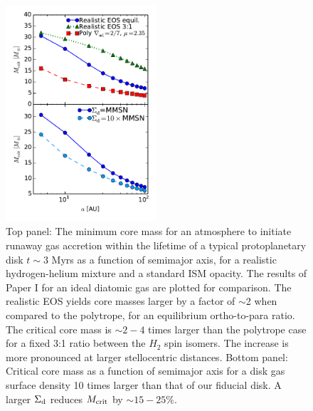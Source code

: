 


\begin{figure}[h!]
\centering
\includegraphics[width=0.5\textwidth]{figures/Mc_vs_a_poly_real_paper.pdf}
\caption{Top panel: The minimum core mass for an atmosphere to initiate runaway gas accretion within the lifetime of a typical protoplanetary disk $t \sim 3$ Myrs as a function of semimajor axis, for a realistic hydrogen-helium mixture and a standard ISM opacity. The results of Paper I for an ideal diatomic gas are plotted for comparison. The realistic EOS yields core masses larger by a factor of $\sim$2 when compared to the polytrope, for an equilibrium ortho-to-para ratio. The critical core mass is $\sim$$2-4$ times larger than the polytrope case for a fixed 3:1 ratio between the $H_2$ spin isomers. The increase is more pronounced at larger stellocentric distances. Bottom panel: Critical core mass as a function of semimajor axis for a disk gas surface density 10 times larger than that of our fiducial disk. A larger $\Sigma_{\rm d}$ reduces $M_{\rm crit}$ by $\sim$$15-25 \%$.}
\label{fig:Mvsaplot}
\end{figure}



